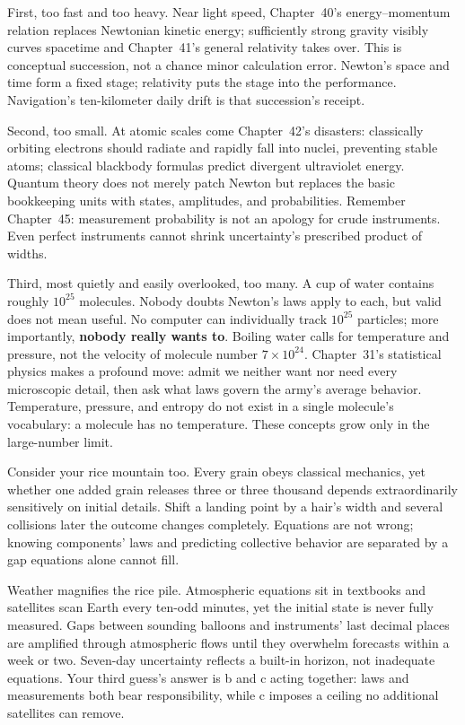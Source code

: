 First, too fast and too heavy. Near light speed, Chapter~40's energy--momentum relation replaces Newtonian kinetic energy; sufficiently strong gravity visibly curves spacetime and Chapter~41's general relativity takes over. This is conceptual succession, not a chance minor calculation error. Newton's space and time form a fixed stage; relativity puts the stage into the performance. Navigation's ten-kilometer daily drift is that succession's receipt.

Second, too small. At atomic scales come Chapter~42's disasters: classically orbiting electrons should radiate and rapidly fall into nuclei, preventing stable atoms; classical blackbody formulas predict divergent ultraviolet energy. Quantum theory does not merely patch Newton but replaces the basic bookkeeping units with states, amplitudes, and probabilities. Remember Chapter~45: measurement probability is not an apology for crude instruments. Even perfect instruments cannot shrink uncertainty's prescribed product of widths.

Third, most quietly and easily overlooked, too many. A cup of water contains roughly $10^{25}$ molecules. Nobody doubts Newton's laws apply to each, but valid does not mean useful. No computer can individually track $10^{25}$ particles; more importantly, \textbf{nobody really wants to}. Boiling water calls for temperature and pressure, not the velocity of molecule number $7\times10^{24}$. Chapter~31's statistical physics makes a profound move: admit we neither want nor need every microscopic detail, then ask what laws govern the army's average behavior. Temperature, pressure, and entropy do not exist in a single molecule's vocabulary: a molecule has no temperature. These concepts grow only in the large-number limit.

Consider your rice mountain too. Every grain obeys classical mechanics, yet whether one added grain releases three or three thousand depends extraordinarily sensitively on initial details. Shift a landing point by a hair's width and several collisions later the outcome changes completely. Equations are not wrong; knowing components' laws and predicting collective behavior are separated by a gap equations alone cannot fill.

Weather magnifies the rice pile. Atmospheric equations sit in textbooks and satellites scan Earth every ten-odd minutes, yet the initial state is never fully measured. Gaps between sounding balloons and instruments' last decimal places are amplified through atmospheric flows until they overwhelm forecasts within a week or two. Seven-day uncertainty reflects a built-in horizon, not inadequate equations. Your third guess's answer is b and c acting together: laws and measurements both bear responsibility, while c imposes a ceiling no additional satellites can remove.

